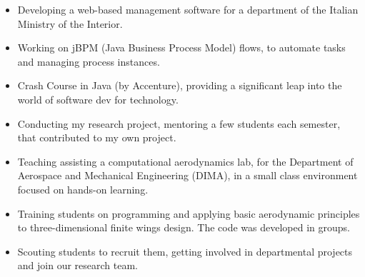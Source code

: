 	\divider

	\begin{itemize}
		\item Developing a web-based management software for a department of the Italian Ministry of the Interior.
		\item Working on jBPM (Java Business Process Model) flows, to automate tasks and managing process instances.
	\end{itemize}

	\medskip

	\begin{itemize}
		\item Crash Course in Java (by Accenture), providing a significant leap into the world of software dev for technology.
	\end{itemize}

	\divider

	\begin{itemize}
		\item Conducting my research project, mentoring a few students each semester, that contributed to my own project.
	\end{itemize}
	\smallskip

	\medskip

	\begin{itemize}
		\item Teaching assisting a computational aerodynamics lab, for the Department of Aerospace and Mechanical Engineering (DIMA), in a small class environment focused on hands-on learning.
		\item Training students on programming and applying basic aerodynamic principles to three-dimensional finite wings design. The code was developed in groups.
		\item Scouting students to recruit them, getting involved in departmental projects and join our research team.
	\end{itemize}
	\medskip

